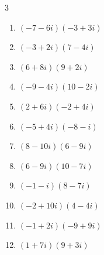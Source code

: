 \begin{multicols}{3}
\begin{enumerate}
        \phantom{$\displaystyle =-98+18i$}

  \item $\displaystyle (-7-6i)(-3+3i)$

        \phantom{$\displaystyle =39-3i$}

  \item $\displaystyle (-3+2i)(7-4i)$

        \phantom{$\displaystyle =-13+26i$}

  \item $\displaystyle (6+8i)(9+2i)$

        \phantom{$\displaystyle =38+84i$}

  \item $\displaystyle (-9-4i)(10-2i)$

        \phantom{$\displaystyle =-98-22i$}

  \item $\displaystyle (2+6i)(-2+4i)$

        \phantom{$\displaystyle =-28-4i$}

  \item $\displaystyle (-5+4i)(-8-i)$

        \phantom{$\displaystyle =44-27i$}

  \item $\displaystyle (8-10i)(6-9i)$

        \phantom{$\displaystyle =-42-132i$}

\columnbreak %

\resetques

  \item $\displaystyle (6-9i)(10-7i)$

        \phantom{$\displaystyle =-3-132i$}

  \item $\displaystyle (-1-i)(8-7i)$

        \phantom{$\displaystyle =-15-i$}

  \item $\displaystyle (-2+10i)(4-4i)$

        \phantom{$\displaystyle =32+48i$}

  \item $\displaystyle (-1+2i)(-9+9i)$

        \phantom{$\displaystyle =-9-27i$}

  \item $\displaystyle (1+7i)(9+3i)$

        \phantom{$\displaystyle =-12+66i$}


\end{enumerate}
\end{multicols}
